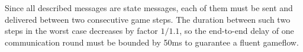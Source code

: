 Since all described messages are state messages, each of them must be sent and
delivered between two consecutive game steps. The duration between such two 
steps in the worst case decreases by factor $1/1.1$, so the end-to-end delay
of one communication round must be bounded by 50ms to guarantee a fluent gameflow. 

